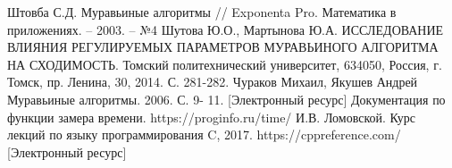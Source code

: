 \documentclass[12pt, a4paper]{report}
\begin{document}
    \begin{thebibliography}{9}
    	 Штовба С.Д. Муравьиные алгоритмы // Exponenta Pro. Математика в приложениях. – 2003. – №4
    	 Шутова Ю.О., Мартынова Ю.А. ИССЛЕДОВАНИЕ ВЛИЯНИЯ РЕГУЛИРУЕМЫХ ПАРАМЕТРОВ МУРАВЬИНОГО АЛГОРИТМА НА СХОДИМОСТЬ. Томский политехнический университет, 634050, Россия, г. Томск, пр. Ленина, 30, 2014. С. 281-282.
    	 Чураков Михаил, Якушев Андрей Муравьиные алгоритмы. 2006. С. 9-
    	11.
    	[Электронный ресурс] Документация по функции замера времени. https://proginfo.ru/time/
    	И.В. Ломовской. Курс лекций по языку программирования C, 2017.
    	 https://cppreference.com/ [Электронный ресурс]
    \end{thebibliography}
\end{document}
